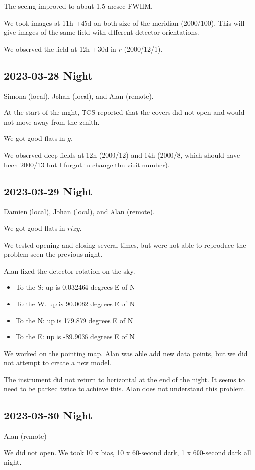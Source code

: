 \documentclass{article}
\begin{document}
The seeing improved to about 1.5 arcsec FWHM.

We took images at 11h +45d on both size of the meridian (2000/100). This will give images of the same field with different detector orientations.

We observed the field at 12h +30d in $r$ (2000/12/1).

\subsection{2023-03-28 Night}

Simona (local), Johan (local), and Alan (remote).

At the start of the night, TCS reported that the covers did not open and would not move away from the zenith.

We got good flats in $g$.

We observed deep fields at 12h (2000/12) and 14h (2000/8, which should have been 2000/13 but I forgot to change the visit number).

\subsection{2023-03-29 Night}

Damien (local), Johan (local), and Alan (remote).

We got good flats in $rizy$.

We tested opening and closing several times, but were not able to reproduce the problem seen the previous night.

Alan fixed the detector rotation on the sky.
\begin{itemize}
\item To the S: up is 0.032464 degrees E of N
\item To the W: up is 90.0082 degrees E of N
\item To the N: up is 179.879 degrees E of N
\item To the E: up is -89.9036 degrees E of N
\end{itemize}

We worked on the pointing map. Alan was able add new data points, but we did not attempt to create a new model.

The instrument did not return to horizontal at the end of the night. It seems to need to be parked twice to achieve this. Alan does not understand this problem.

\subsection{2023-03-30 Night}

Alan (remote)

We did not open. We took 10 x bias, 10 x 60-second dark, 1 x 600-second dark all night.
\end{document}
